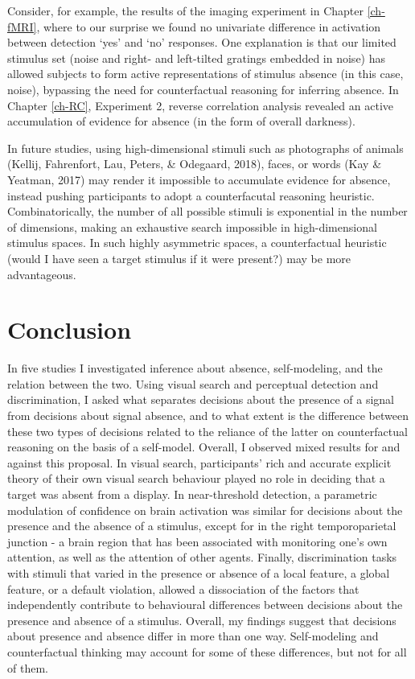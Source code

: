 \documentclass[12pt,twoside]{reedthesis}
\begin{document}
Consider, for example, the results of the imaging experiment in Chapter \ref{ch-fMRI}, where to our surprise we found no univariate difference in activation between detection `yes' and `no' responses. One explanation is that our limited stimulus set (noise and right- and left-tilted gratings embedded in noise) has allowed subjects to form active representations of stimulus absence (in this case, noise), bypassing the need for counterfactual reasoning for inferring absence. In Chapter \ref{ch-RC}, Experiment 2, reverse correlation analysis revealed an active accumulation of evidence for absence (in the form of overall darkness).

In future studies, using high-dimensional stimuli such as photographs of animals (Kellij, Fahrenfort, Lau, Peters, \& Odegaard, 2018), faces, or words (Kay \& Yeatman, 2017) may render it impossible to accumulate evidence for absence, instead pushing participants to adopt a counterfacutal reasoning heuristic. Combinatorically, the number of all possible stimuli is exponential in the number of dimensions, making an exhaustive search impossible in high-dimensional stimulus spaces. In such highly asymmetric spaces, a counterfactual heuristic (would I have seen a target stimulus if it were present?) may be more advantageous.

\hypertarget{conclusion-2}{%
\section*{Conclusion}\label{conclusion-2}}

In five studies I investigated inference about absence, self-modeling, and the relation between the two. Using visual search and perceptual detection and discrimination, I asked what separates decisions about the presence of a signal from decisions about signal absence, and to what extent is the difference between these two types of decisions related to the reliance of the latter on counterfactual reasoning on the basis of a self-model. Overall, I observed mixed results for and against this proposal. In visual search, participants' rich and accurate explicit theory of their own visual search behaviour played no role in deciding that a target was absent from a display. In near-threshold detection, a parametric modulation of confidence on brain activation was similar for decisions about the presence and the absence of a stimulus, except for in the right temporoparietal junction - a brain region that has been associated with monitoring one's own attention, as well as the attention of other agents. Finally, discrimination tasks with stimuli that varied in the presence or absence of a local feature, a global feature, or a default violation, allowed a dissociation of the factors that independently contribute to behavioural differences between decisions about the presence and absence of a stimulus. Overall, my findings suggest that decisions about presence and absence differ in more than one way. Self-modeling and counterfactual thinking may account for some of these differences, but not for all of them.
\end{document}

